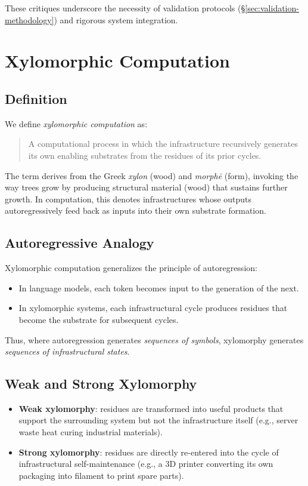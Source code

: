 \documentclass[12pt]{article}
\theoremstyle{plain}
\begin{document}
{{{{{{{{{{{{{{{{These critiques underscore the necessity of validation protocols (\S\ref{sec:validation-methodology}) and rigorous system integration.



\appendix

\appendix
\section{Xylomorphic Computation}
\label{app:xylomorphic}

\subsection{Definition}

We define \emph{xylomorphic computation} as:
\begin{quote}
    A computational process in which the infrastructure recursively generates its own enabling substrates from the residues of its prior cycles.
\end{quote}
The term derives from the Greek \textit{xylon} (wood) and \textit{morphē} (form), invoking the way trees grow by producing structural material (wood) that sustains further growth. In computation, this denotes infrastructures whose outputs autoregressively feed back as inputs into their own substrate formation.

\subsection{Autoregressive Analogy}

Xylomorphic computation generalizes the principle of autoregression:
\begin{itemize}
    \item In language models, each token becomes input to the generation of the next.
    \item In xylomorphic systems, each infrastructural cycle produces residues that become the substrate for subsequent cycles.
\end{itemize}
Thus, where autoregression generates \emph{sequences of symbols}, xylomorphy generates \emph{sequences of infrastructural states}.

\subsection{Weak and Strong Xylomorphy}

\begin{itemize}
    \item \textbf{Weak xylomorphy}: residues are transformed into useful products that support the surrounding system but not the infrastructure itself (e.g., server waste heat curing industrial materials).
    \item \textbf{Strong xylomorphy}: residues are directly re-entered into the cycle of infrastructural self-maintenance (e.g., a 3D printer converting its own packaging into filament to print spare parts).
\end{itemize}

}}}}}}}}}}}}}}}}
\end{document}

